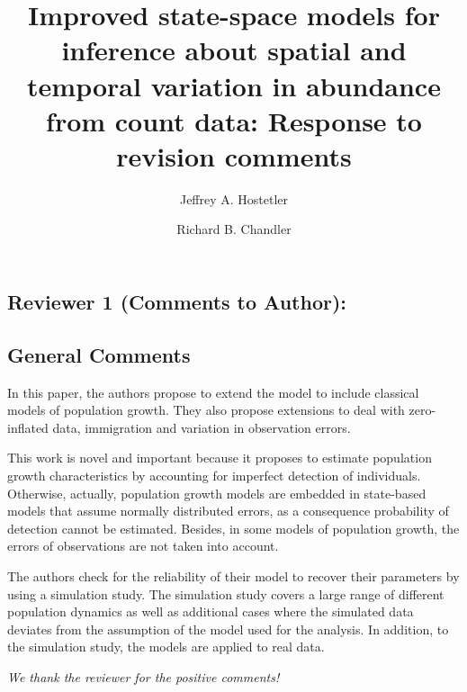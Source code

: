 \documentclass[12pt,english]{article}
\title{Improved state-space models for inference about 
spatial and temporal variation in abundance from count data: Response to revision comments}
\author{Jeffrey A. Hostetler
   \and Richard B. Chandler    
}
\date{}
\begin{document}
\maketitle
\vspace{-1cm}
\begin{spacing}{1.9}
\begin{flushleft}
\renewcommand*\thetable{R\arabic{table}}
\renewcommand*\thefigure{R\arabic{figure}}
\renewcommand*\theequation{R\arabic{equation}}

\section*{Reviewer 1 (Comments to Author):} 
\label{sec:rev1}

\subsection*{General Comments}
In this paper, the authors propose to extend the \citet{dail_madsen:2011} model to 
include classical models of population growth. They also propose extensions to 
deal with zero-inflated data, immigration and variation in observation errors.

This work is novel and important because it proposes to estimate population 
growth characteristics by accounting for imperfect detection of individuals. Otherwise, 
actually, population growth models are embedded in state-based models that assume 
normally distributed errors, as a consequence probability of detection cannot be estimated. 
Besides, in some models of population growth, the errors of observations are not taken 
into account.

The authors check for the reliability of their model to recover their parameters by using a 
simulation study. The simulation study covers a large range of different population 
dynamics as well as additional cases where the simulated data deviates from the assumption 
of the model used for the analysis. In addition, to the simulation study, the models are 
applied to real data.

\vspace{0.5cm}
\textit{We thank the reviewer for the positive comments!}
\vspace{0.5cm}


\end{flushleft}
\end{spacing}
\end{document}
